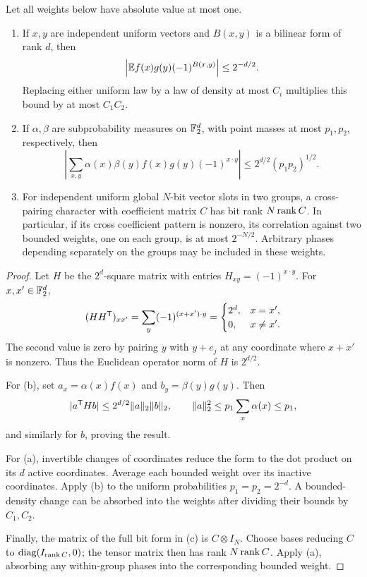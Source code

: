 \begin{lemma}\label{lem:walsh}
Let all weights below have absolute value at most one.
\begin{enumerate}[label=\textup{(\alph*)}]
\item
If \(x,y\) are independent uniform vectors and \(B(x,y)\) is a bilinear form of rank \(d\), then
\[
 \left|\mathbb E f(x)g(y)(-1)^{B(x,y)}\right|\le2^{-d/2}.
\]
Replacing either uniform law by a law of density at most \(C_i\) multiplies this bound by at most \(C_1C_2\).

\item
If \(\alpha,\beta\) are subprobability measures on \(\mathbb F_2^d\), with point masses at most \(p_1,p_2\), respectively, then
\[
 \left|\sum_{x,y}\alpha(x)\beta(y)f(x)g(y)(-1)^{x\cdot y}\right|
 \le2^{d/2}(p_1p_2)^{1/2}.
\]

\item
For independent uniform global \(N\)-bit vector slots in two groups, a cross-pairing character with coefficient matrix \(C\) has bit rank \(N\operatorname{rank} C\).
In particular, if its cross coefficient pattern is nonzero, its correlation against two bounded weights, one on each group, is at most \(2^{-N/2}\).
Arbitrary phases depending separately on the groups may be included in these weights.
\end{enumerate}
\end{lemma}
\begin{proof}
Let \(H\) be the \(2^d\)-square matrix with entries \(H_{xy}=(-1)^{x\cdot y}\).
For \(x,x'\in\mathbb F_2^d\),
\[
 (HH^{\mathsf T})_{xx'}=\sum_y(-1)^{(x+x')\cdot y}
 =\begin{cases}2^d,&x=x',\\0,&x\ne x'.\end{cases}
\]
The second value is zero by pairing \(y\) with \(y+e_j\) at any coordinate where \(x+x'\) is nonzero.
Thus the Euclidean operator norm of \(H\) is \(2^{d/2}\).

For (b), set \(a_x=\alpha(x)f(x)\) and \(b_y=\beta(y)g(y)\).
Then
\[
 |a^{\mathsf T} Hb|\le2^{d/2}\|a\|_2\|b\|_2,\qquad
 \|a\|_2^2\le p_1\sum_x\alpha(x)\le p_1,
\]
and similarly for \(b\), proving the result.

For (a), invertible changes of coordinates reduce the form to the dot product on its \(d\) active coordinates.
Average each bounded weight over its inactive coordinates.
Apply (b) to the uniform probabilities \(p_1=p_2=2^{-d}\).
A bounded-density change can be absorbed into the weights after dividing their bounds by \(C_1,C_2\).

Finally, the matrix of the full bit form in (c) is \(C\otimes I_N\).
Choose bases reducing \(C\) to \(\operatorname{diag}(I_{\operatorname{rank} C},0)\); the tensor matrix then has rank \(N\operatorname{rank} C\).
Apply (a), absorbing any within-group phases into the corresponding bounded weight.
\end{proof}
